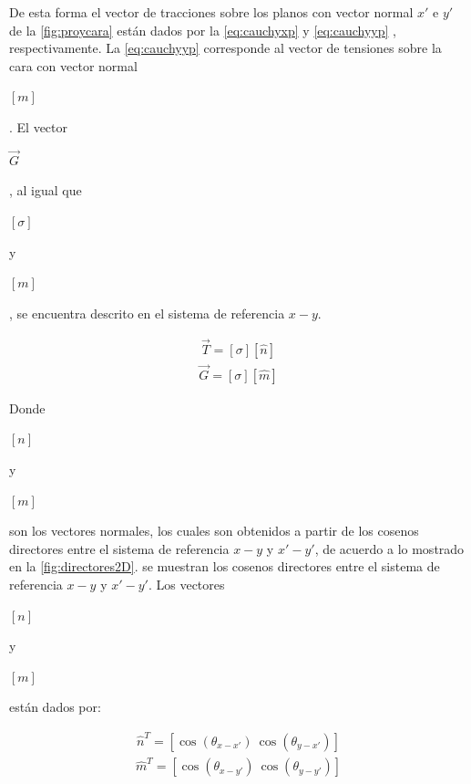 \documentclass[12pt,letterpaper, twoside, openany]{article}
\begin{document}
De esta forma el vector de tracciones sobre los planos con vector normal $x'$ e $y'$ de la \cref{fig:proycara} están dados por la \cref {eq:cauchyxp} y  \cref {eq:cauchyyp} , respectivamente.  
%
La \cref{eq:cauchyyp} corresponde al vector de tensiones sobre la cara con vector normal \begin{large} $\left[ m \right]$\end{large}. El vector \begin{large} $\overset{\rightarrow}{G}$\end{large}, al igual que  \begin{large} $\left[ \sigma \right]$\end{large} y \begin{large} $\left[ m \right]$\end{large}, se encuentra descrito en el sistema de referencia $x-y$.
%
\begin{large}
	\begin{align}
		\overset{\rightarrow}{T}=\left[ \sigma \right] \left[\hat{n}\right]
		\label{eq:cauchyxp}
	\end{align}
%	
	\begin{align}
		\overset{\rightarrow}{G}=\left[ \sigma \right] \left[\hat{m}\right]
		\label{eq:cauchyyp}
	\end{align}
\end{large}
%
Donde \begin{large} $\left[ n \right]$\end{large}  y \begin{large} $\left[ m \right]$\end{large} son los vectores normales, los cuales son obtenidos a partir de los cosenos directores entre el sistema de referencia $x-y$ y $x'-y'$, de acuerdo a lo mostrado en la \cref{fig:directores2D}. se muestran los cosenos directores entre el sistema de referencia $x-y$ y $x'-y'$. Los vectores \begin{large} $\left[ n \right]$\end{large}  y \begin{large} $\left[ m \right]$\end{large} están dados por: 
%
\begin{large}
	\begin{align}
		\hat{n}^T=\left[ \cos \left( \theta_{x-x'} \right)\ \cos \left( \theta_{y-x'} \right)\right]
		\label{eq:normaln}
	\end{align}
	\begin{align}
		\hat{m}^T=\left[ \cos \left( \theta_{x-y'} \right)\ \cos \left( \theta_{y-y'} \right)\right]
		\label{eq:normalm}
	\end{align}
\end{large}
\end{document}
